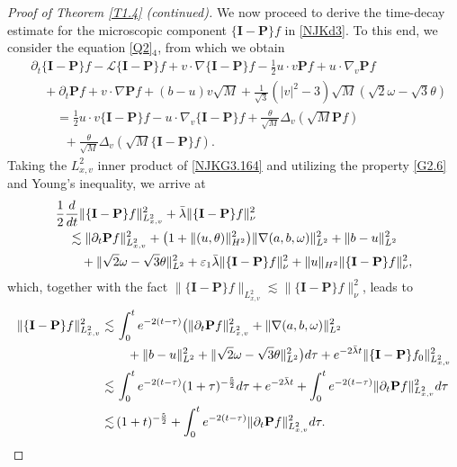 \documentclass[10pt,a4paper]{amsart}
\newcommand{\eps}{{\varepsilon}}
\begin{document}
\begin{proof}[Proof of Theorem \ref{T1.4} \emph{(}continued\emph{)}]
We now proceed to derive the time-decay estimate  for the microscopic
 component $\{\mathbf{I}-\mathbf{P}\}f$ in \eqref{NJKd3}. To this end, we consider the equation 
 \eqref{Q2}$_4$, from which we obtain  
\begin{align}\label{NJKG3.164}
&\partial_t \{\mathbf{I}-\mathbf{P}\}f-\mathcal{L}{\{\mathbf{I}-\mathbf{P}\}}f
+v\cdot\nabla\{\mathbf{I}-\mathbf{P}\}f-\frac{1}{2}u\cdot v\mathbf{P}f+u\cdot\nabla_v\mathbf{P}f\nonumber\\
&\quad +\partial_t {\mathbf{P}f}+v\cdot\nabla {\mathbf{P}f}+(b-u)v\sqrt{M}
+\frac{1}{\sqrt{3}}(|v|^2-3)\sqrt{M}(\sqrt{2}\omega-\sqrt{3}\theta)\nonumber\\
&\qquad =  \frac{1}{2}u\cdot v\{\mathbf{I}-\mathbf{P}\}f
-u\cdot \nabla_v\{\mathbf{I}-\mathbf{P}\}f+\frac{\theta}{\sqrt{M}} \Delta_v(\sqrt{M}  \mathbf{P}f)\nonumber\\
& \qquad \ \ \, +\frac{\theta}{\sqrt{M}} \Delta_v(\sqrt{M} \{\mathbf{I}- \mathbf{P}\}f).
\end{align}
Taking the $L^2_{x,v}$ inner product of \eqref{NJKG3.164} and utilizing the
 property \eqref{G2.6} and Young's inequality, we  arrive at
\begin{align*} 
&\frac{1}{2}  \frac{\rm d}{{\rm d}t} \|\{\mathbf{I}-
\mathbf{P}\}f\|_{L_{x,v}^2}^2+\bar\lambda \|\{\mathbf{I}-\mathbf{P}\}f\|_{\nu}^2\nonumber\\
&\quad \lesssim \|\partial_t{\mathbf{P}f} \|_{L_{x,v}^2}^2
+\big(1+\|(u,\theta)\|_{H^2}^2\big)\|\nabla(a,b,\omega)\|_{L^2}^2+\|b-u\|_{L^2}^2
\nonumber\\
&\qquad+\|\sqrt{2}\omega-\sqrt{3}\theta\|_{L^2}^2 
+\eps_1\bar\lambda\|\{\mathbf{I}-\mathbf{P}\}f\|_{\nu}^2+\|u\|_{H^2}\|\{\mathbf{I}-\mathbf{P}\}f\|_{\nu}^2,
\end{align*}
which, together with the fact $ \|\{\mathbf{I}-\mathbf{P}\}f\|_{L_{x,v}^2} 
\lesssim\|\{\mathbf{I}-\mathbf{P}\}f\|_{\nu}^2$, leads to
\begin{align}\label{NJKG3.165}
  \|\{\mathbf{I}-\mathbf{P}\}f\|_{L_{x,v}^2}^2 
 \lesssim&\, \int_0^t e^{-2(t-\tau)}\big( \|\partial_t{\mathbf{P}f} 
 \|_{L_{x,v}^2}^2+\|\nabla(a,b,\omega)\|_{L^2}^2\nonumber\\
 & \quad + \|b-u\|_{L^2}^2
 +\|\sqrt{2}\omega-\sqrt{3}\theta\|_{L^2}^2  \big){\rm d}\tau %
  +e^{-2\bar\lambda t}  \|\{\mathbf{I}-\mathbf{P}\}f_0\|_{L_{x,v}^2}^2\nonumber\\
 \lesssim&\, \int_0^t e^{-2(t-\tau)}(1+\tau)^{-\frac{5}{2}}{\rm d}\tau
 +e^{-2\bar\lambda t}+ \int_0^t e^{-2(t-\tau)}  \|\partial_t{\mathbf{P}f} \|_{L_{x,v}^2}^2{\rm d}\tau\nonumber\\
 \lesssim&\,(1+t)^{-\frac{5}{2}} + \int_0^t e^{-2(t-\tau)}  \|\partial_t{\mathbf{P}f} \|_{L_{x,v}^2}^2{\rm d}\tau.
\end{align}


\end{proof}
\end{document}
